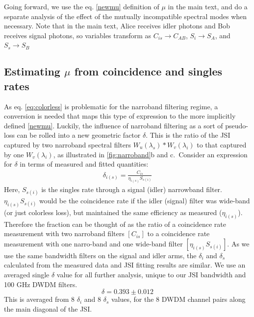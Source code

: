 \documentclass[11pt]{caltech_thesis} %
\begin{document}
Going forward, we use the eq. \ref{newmu} definition of $\mu$ in the main text, and do a separate analysis of the effect of the mutually incompatible spectral modes when necessary. Note that in the main text, Alice receives idler photons and Bob receives signal photons, so variables transform as $C_{is} \rightarrow C_{AB}$, $S_{i} \rightarrow S_{A}$, and $S_{s} \rightarrow S_{B}$

\hypertarget{estimating-from-coincidence-and-singles-rates}{%
\subsection{\texorpdfstring{Estimating \texorpdfstring{$\mu$}{mu} from coincidence and singles rates}{Estimating  from coincidence and singles rates}}\label{estimating-from-coincidence-and-singles-rates}}

As eq. \ref{eq:colorless} is problematic for the narroband filtering regime, a conversion is needed that maps this type of expression to the more implicitly defined \ref{newmu}. Luckily, the influence of narroband filtering as a sort of pseudo-loss can be rolled into a new geometric factor $\delta$. This is the ratio of the JSI captured by two narroband spectral filters $W_u(\lambda_s)*W_v(\lambda_i)$ to that captured by one $W_v(\lambda_i)$, as illustrated in \ref{fig:narroband}b and c.~Consider an expression for $\delta$ in terms of measured and fitted quantities:
\begin{align} 
\delta_{i(s)} = \frac{C_{is}}{\eta_{i(s)}S_{s(i)}} \label{new_eff}
\end{align}
Here, $S_{s(i)}$ is the singles rate through a signal (idler) narrowband filter. $\eta_{i(s)}S_{s(i)}$ would be the coincidence rate if the idler (signal) filter was wide-band (or just colorless loss), but maintained the same efficiency as measured ($\eta_{i(s)}$). Therefore the fraction can be thought of as the ratio of a coincidence rate measurement with two narroband filters $[C_{is}]$ to a coincidence rate measurement with one narro-band and one wide-band filter $[\eta_{i(s)}S_{s(i)}]$. As we use the same bandwidth filters on the signal and idler arms, the $\delta_i$ and $\delta_s$ calculated from the measured data and JSI fitting results are similar. We use an averaged single $\delta$ value for all further analysis, unique to our JSI bandwidth and 100 GHz DWDM filters.
$$\delta = 0.393 \pm 0.012$$
This is averaged from 8 $\delta_i$ and 8 $\delta_s$ values, for the 8 DWDM channel pairs along the main diagonal of the JSI.
\end{document}
